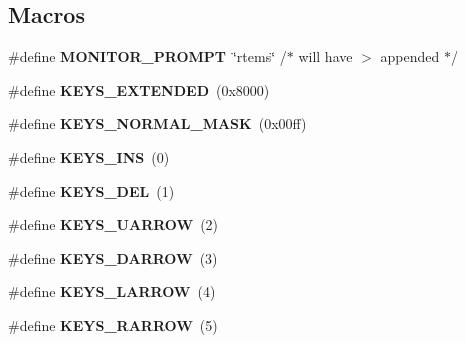 \subsection*{Macros}
\begin{DoxyCompactItemize}
\item 
\mbox{\label{mon-editor_8c_a63d8e1f09b7393888acab18dfabf5a41}} 
\#define {\bfseries M\+O\+N\+I\+T\+O\+R\+\_\+\+P\+R\+O\+M\+PT}~\char`\"{}rtems\char`\"{}          /$\ast$ will have \textquotesingle{}$>$ \textquotesingle{} appended $\ast$/
\item 
\mbox{\label{mon-editor_8c_a2f357ce8873460ba025d968f58323f09}} 
\#define {\bfseries K\+E\+Y\+S\+\_\+\+E\+X\+T\+E\+N\+D\+ED}~(0x8000)
\item 
\mbox{\label{mon-editor_8c_a7d4e6de1e65aeeb996d5dfc221476b11}} 
\#define {\bfseries K\+E\+Y\+S\+\_\+\+N\+O\+R\+M\+A\+L\+\_\+\+M\+A\+SK}~(0x00ff)
\item 
\mbox{\label{mon-editor_8c_a4e721b5287e13d5bcf49cf8a30fc9f12}} 
\#define {\bfseries K\+E\+Y\+S\+\_\+\+I\+NS}~(0)
\item 
\mbox{\label{mon-editor_8c_a4e21bc577fabeb887e5695c3e1c2072c}} 
\#define {\bfseries K\+E\+Y\+S\+\_\+\+D\+EL}~(1)
\item 
\mbox{\label{mon-editor_8c_aeabbeb79ec4be12596cade4d9614ea05}} 
\#define {\bfseries K\+E\+Y\+S\+\_\+\+U\+A\+R\+R\+OW}~(2)
\item 
\mbox{\label{mon-editor_8c_a144836e2b66a254985575d9e0d934faf}} 
\#define {\bfseries K\+E\+Y\+S\+\_\+\+D\+A\+R\+R\+OW}~(3)
\item 
\mbox{\label{mon-editor_8c_a031eba461a49291d3ca2cdeb7f7cc7fc}} 
\#define {\bfseries K\+E\+Y\+S\+\_\+\+L\+A\+R\+R\+OW}~(4)
\item 
\mbox{\label{mon-editor_8c_af91cdbc9a466102eaa9b2258d3600f8a}} 
\#define {\bfseries K\+E\+Y\+S\+\_\+\+R\+A\+R\+R\+OW}~(5)
\item 
\mbox{\label{mon-editor_8c_a1fa6cd241bf6e6d0dbd37d102cf9f79b}} 

\end{DoxyCompactItemize}
